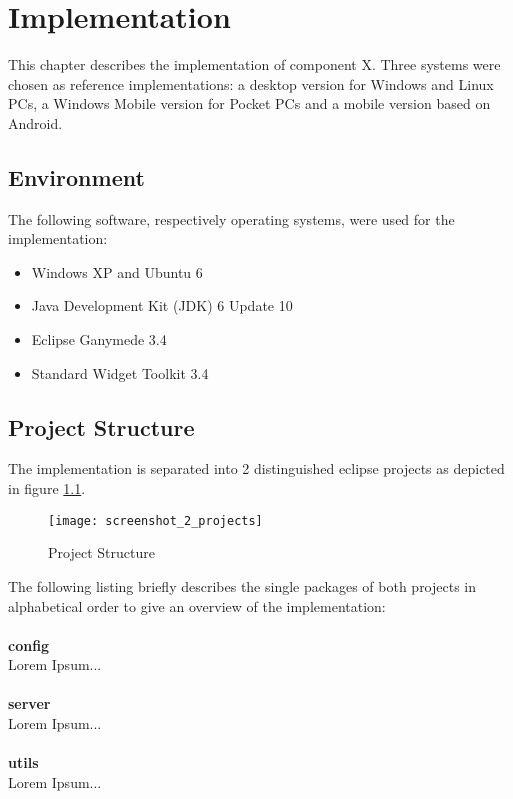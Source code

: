 \chapter{Implementation\label{cha:chapter5}}

This chapter describes the implementation of component X. Three systems were chosen as reference implementations: a desktop version for Windows and Linux PCs, a Windows Mobile version for Pocket PCs and a mobile version based on Android. 

\section{Environment\label{sec:env}}
The following software, respectively operating systems, were used for the implementation:

\begin{itemize}
		\item Windows XP and Ubuntu 6
		\vspace{-0.1in} 
		\item Java Development Kit (JDK) 6 Update 10 
		\vspace{-0.1in} 
		\item Eclipse Ganymede 3.4
		\vspace{-0.1in} 
		\item Standard Widget Toolkit 3.4
\end{itemize}

\section{Project Structure\label{sec:projectstructure}}

The implementation is separated into 2 distinguished eclipse projects as depicted in figure \ref{fig:projects}.

\begin{figure}[htb]
  \centering
  \texttt{[image: screenshot\_2\_projects]}
  \caption{Project Structure}
  \label{fig:projects}
\end{figure}

\noindent
The following listing briefly describes the single packages of both projects in alphabetical order to give an overview of the implementation:
\\
\\
\textbf{config} 
\\
Lorem Ipsum...
\\
\\
\textbf{server} 
\\
Lorem Ipsum...
\\
\\
\textbf{utils} 
\\
Lorem Ipsum...

